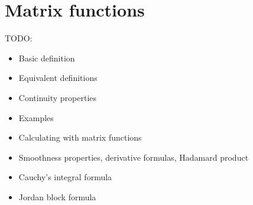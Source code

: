 \chapter{Matrix functions}

TODO:
\begin{itemize}
	\item Basic definition
	\item Equivalent definitions
	\item Continuity properties
	\item Examples
	\item Calculating with matrix functions
	\item Smoothness properties, derivative formulas, Hadamard product
	\item Cauchy's integral formula
	\item Jordan block formula
\end{itemize}
